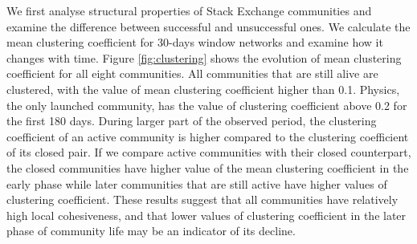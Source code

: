 We first analyse structural properties of Stack Exchange communities and examine the difference between successful and unsuccessful ones. We calculate the mean clustering coefficient for 30-days window networks and examine how it changes with time. Figure \ref{fig:clustering} shows the evolution of mean clustering coefficient for all eight communities. All communities that are still alive are clustered, with the value of mean clustering coefficient higher than 0.1. Physics, the only launched community, has the value of clustering coefficient above 0.2 for the first 180 days.
During larger part of the observed period, the clustering coefficient of an active community is higher compared to the clustering coefficient of its closed pair. If we compare active communities with their closed counterpart, the closed communities have higher value of the mean clustering coefficient in the early phase while later communities that are still active have higher values of clustering coefficient. These results suggest that all communities have relatively high local cohesiveness, and that lower values of clustering coefficient in the later phase of community life may be an indicator of its decline. 

